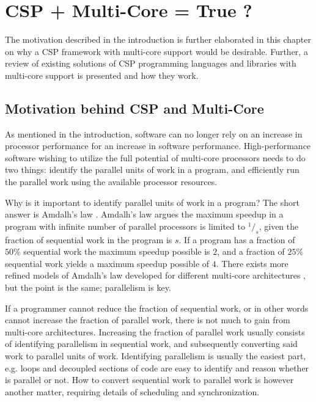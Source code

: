 

\chapter{CSP + Multi\hyp{}Core = True ?}
\label{ch:multicore_csp}

The motivation described in the introduction is further elaborated in this chapter on why a CSP framework with multi\hyp{}core support would be desirable. Further, a review of existing solutions of CSP programming languages and libraries with multi\hyp{}core support is presented and how they work.


\section{Motivation behind CSP and Multi\hyp{}Core}
\label{sec:multicore_csp_motivation}


As mentioned in the introduction, software can no longer rely on an increase in processor performance for an increase in software performance. High\hyp{}performance software wishing to utilize the full potential of multi\hyp{}core processors needs to do two things: identify the parallel units of work in a program, and efficiently run the parallel work using the available processor resources. 

Why is it important to identify parallel units of work in a program? The short answer is Amdalh's law \citep{amdahl1967validity}. Amdalh's law argues the maximum speedup in a program with infinite number of parallel processors is limited to $^1/_s$, given the fraction of sequential work in the program is $s$. If a program has a fraction of $50\%$ sequential work the maximum speedup possible is $2$, and a fraction of $25\%$ sequential work yields a maximum speedup possible of $4$. There exists more refined models of Amdalh's law developed for different multi\hyp{}core architectures \citep{sun2010reevaluating}, but the point is the same; parallelism is key.

If a programmer cannot reduce the fraction of sequential work, or in other words cannot increase the fraction of parallel work, there is not much to gain from multi\hyp{}core architectures. Increasing the fraction of parallel work usually consists of identifying parallelism in sequential work, and subsequently converting said work to parallel units of work. Identifying parallelism is usually the easiest part, e.g. loops and decoupled sections of code are easy to identify and reason whether is parallel or not. How to convert sequential work to parallel work is however another matter, requiring details of scheduling and synchronization.

